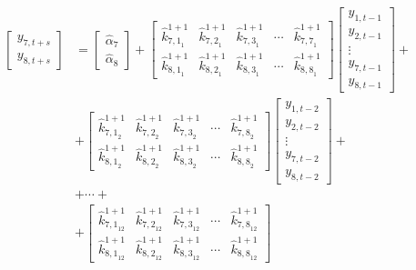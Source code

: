 \documentclass[a4paper,11pt,listof=nochaptergap,oneside,pointednumbers,bibtotoc,bigheadings,liststotoc]{scrbook}
\theoremstyle{mysatz}
\theoremstyle{mydefinition}
\theoremstyle{mybemerkung}
\let\oldhat\hat
\newcommand{\hattnobf}[1]{\oldhat{#1}}
\begin{document}
\begin{enumerate}
\begin{equation} \label{eq:localproj46}
\begin{split}
		\begin{bmatrix}
		y_{7, t+s} \\
		y_{8,t+s}
 		\end{bmatrix} & = 
		\begin{bmatrix}
		\hattnobf{\alpha}_{{7}} \\
		\hattnobf{\alpha}_{{8}}
 		\end{bmatrix} + 
		\begin{bmatrix}
		{\hattnobf{k}_{{7, 1}_1}^{1+1}} & {\hattnobf{k}_{{7, 2}_1}^{1+1}} & {\hattnobf{k}_{{7, 3}_1}^{1+1}} & \cdots & {\hattnobf{k}_{{7, 7}_1}^{1+1}}\\
		{\hattnobf{k}_{{8, 1}_1}^{1+1}} & {\hattnobf{k}_{{8, 2}_1}^{1+1}} & {\hattnobf{k}_{{8, 3}_1}^{1+1}} & \cdots & {\hattnobf{k}_{{8, 8}_1}^{1+1}}
 		\end{bmatrix} 
		\begin{bmatrix}
    		y_{1,t-1} \\
    		y_{2,t-1} \\
		\vdots \\
		y_{7, t-1} \\
		y_{8, t-1}
 		\end{bmatrix} + \\
		& +
		\begin{bmatrix}
		{\hattnobf{k}_{{7, 1}_2}^{1+1}} & {\hattnobf{k}_{{7, 2}_2}^{1+1}} & {\hattnobf{k}_{{7, 3}_2}^{1+1}} & \cdots & {\hattnobf{k}_{{7, 8}_2}^{1+1}}\\
		{\hattnobf{k}_{{8, 1}_2}^{1+1}} & {\hattnobf{k}_{{8, 2}_2}^{1+1}} & {\hattnobf{k}_{{8, 3}_2}^{1+1}} & \cdots & {\hattnobf{k}_{{8, 8}_2}^{1+1}}
 		\end{bmatrix} 
		\begin{bmatrix}
    		y_{1,t-2} \\
    		y_{2,t-2} \\
		\vdots \\
		y_{7, t-2} \\
		y_{8, t-2}
 		\end{bmatrix} +\\
		& + \cdots + \\
		& + 
		\begin{bmatrix}
    		{\hattnobf{k}_{{7, 1}_{12}}^{1+1}} & {\hattnobf{k}_{{7, 2}_{12}}^{1+1}} & {\hattnobf{k}_{{7, 3}_{12}}^{1+1}} & \cdots & {\hattnobf{k}_{{7, 8}_{12}}^{1+1}}\\
		{\hattnobf{k}_{{8, 1}_{12}}^{1+1}} & {\hattnobf{k}_{{8, 2}_{12}}^{1+1}} & {\hattnobf{k}_{{8, 3}_{12}}^{1+1}} & \cdots & {\hattnobf{k}_{{8, 8}_{12}}^{1+1}}

\end{bmatrix}
\end{split}
\end{equation}
\end{enumerate}
\end{document}
